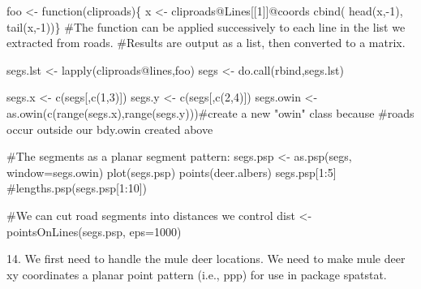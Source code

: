\documentclass[
  letterpaper,
]{book}
\newenvironment{Shaded}{\begin{snugshade}}{\end{snugshade}}
\newcommand{\AttributeTok}[1]{\textcolor[rgb]{0.40,0.45,0.13}{#1}}
\newcommand{\CommentTok}[1]{\textcolor[rgb]{0.37,0.37,0.37}{#1}}
\newcommand{\ControlFlowTok}[1]{\textcolor[rgb]{0.00,0.23,0.31}{#1}}
\newcommand{\DecValTok}[1]{\textcolor[rgb]{0.68,0.00,0.00}{#1}}
\newcommand{\FunctionTok}[1]{\textcolor[rgb]{0.28,0.35,0.67}{#1}}
\newcommand{\NormalTok}[1]{\textcolor[rgb]{0.00,0.23,0.31}{#1}}
\newcommand{\OtherTok}[1]{\textcolor[rgb]{0.00,0.23,0.31}{#1}}
\newcommand{\SpecialCharTok}[1]{\textcolor[rgb]{0.37,0.37,0.37}{#1}}
\begin{document}
\begin{Shaded}
\begin{Highlighting}[]
\NormalTok{foo }\OtherTok{\textless{}{-}} \ControlFlowTok{function}\NormalTok{(cliproads)\{}
\NormalTok{x }\OtherTok{\textless{}{-}}\NormalTok{ cliproads}\SpecialCharTok{@}\NormalTok{Lines[[}\DecValTok{1}\NormalTok{]]}\SpecialCharTok{@}\NormalTok{coords}
\FunctionTok{cbind}\NormalTok{(}
\FunctionTok{head}\NormalTok{(x,}\SpecialCharTok{{-}}\DecValTok{1}\NormalTok{),}
\FunctionTok{tail}\NormalTok{(x,}\SpecialCharTok{{-}}\DecValTok{1}\NormalTok{))\}}
\CommentTok{\#The function can be applied successively to each line in the list we extracted from roads. }
\CommentTok{\#Results are output as a list, then converted to a matrix.}

\NormalTok{segs.lst }\OtherTok{\textless{}{-}} \FunctionTok{lapply}\NormalTok{(cliproads}\SpecialCharTok{@}\NormalTok{lines,foo)}
\NormalTok{segs }\OtherTok{\textless{}{-}} \FunctionTok{do.call}\NormalTok{(rbind,segs.lst)}

\NormalTok{segs.x }\OtherTok{\textless{}{-}} \FunctionTok{c}\NormalTok{(segs[,}\FunctionTok{c}\NormalTok{(}\DecValTok{1}\NormalTok{,}\DecValTok{3}\NormalTok{)])}
\NormalTok{segs.y }\OtherTok{\textless{}{-}} \FunctionTok{c}\NormalTok{(segs[,}\FunctionTok{c}\NormalTok{(}\DecValTok{2}\NormalTok{,}\DecValTok{4}\NormalTok{)])}
\NormalTok{segs.owin }\OtherTok{\textless{}{-}} \FunctionTok{as.owin}\NormalTok{(}\FunctionTok{c}\NormalTok{(}\FunctionTok{range}\NormalTok{(segs.x),}\FunctionTok{range}\NormalTok{(segs.y)))}\CommentTok{\#create a new "owin" class because }
\CommentTok{\#roads occur outside our bdy.owin created above}

\CommentTok{\#The segments as a planar segment pattern:}
\NormalTok{segs.psp }\OtherTok{\textless{}{-}} \FunctionTok{as.psp}\NormalTok{(segs, }\AttributeTok{window=}\NormalTok{segs.owin)}
\FunctionTok{plot}\NormalTok{(segs.psp)}
\FunctionTok{points}\NormalTok{(deer.albers)}
\NormalTok{segs.psp[}\DecValTok{1}\SpecialCharTok{:}\DecValTok{5}\NormalTok{]}
\CommentTok{\#lengths.psp(segs.psp[1:10])}

\CommentTok{\#We can cut road segments into distances we control}
\NormalTok{dist }\OtherTok{\textless{}{-}} \FunctionTok{pointsOnLines}\NormalTok{(segs.psp, }\AttributeTok{eps=}\DecValTok{1000}\NormalTok{)}
\end{Highlighting}
\end{Shaded}

14. We first need to handle the mule deer locations. We need to make
mule deer xy coordinates a planar point pattern (i.e., ppp) for use in
package spatstat.
\end{document}
